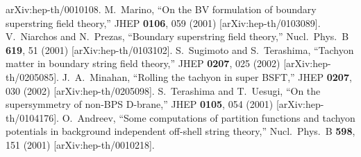 \documentclass[12pt,a4paper]{article}
\begin{document}
\begin{thebibliography}{99}
arXiv:hep-th/0010108.
M.~Marino,
``On the BV formulation of boundary superstring field theory,''
JHEP {\bf 0106}, 059 (2001)
[arXiv:hep-th/0103089].
V.~Niarchos and N.~Prezas,
``Boundary superstring field theory,''
Nucl.\ Phys.\ B {\bf 619}, 51 (2001)
[arXiv:hep-th/0103102].
S.~Sugimoto and S.~Terashima,
``Tachyon matter in boundary string field theory,''
JHEP {\bf 0207}, 025 (2002)
[arXiv:hep-th/0205085].
J.~A.~Minahan,
``Rolling the tachyon in super BSFT,''
JHEP {\bf 0207}, 030 (2002)
[arXiv:hep-th/0205098].
S.~Terashima and T.~Uesugi,
``On the supersymmetry of non-BPS D-brane,''
JHEP {\bf 0105}, 054 (2001)
[arXiv:hep-th/0104176].
O.~Andreev,
``Some computations of partition functions and tachyon potentials in
background independent off-shell string theory,''
Nucl.\ Phys.\ B {\bf 598}, 151 (2001)
[arXiv:hep-th/0010218].
\end{thebibliography}
\end{document}
